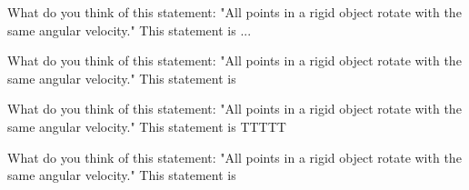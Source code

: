 \documentclass{ximera}
\begin{document}




\begin{exercise}
	\begin{question}
		What do you think of this statement: "All points in a rigid object rotate with the same angular velocity." This statement is ...\begin{multipleChoice} \end{multipleChoice}			
	\end{question}
\end{exercise}

\begin{exercise}
    \begin{question}
        What do you think of this statement: "All points in a rigid object rotate with the same angular velocity." This statement is 
    \end{question}
\end{exercise}

\newcommand{\choiceGroot}{{\wordChoice{\choice[correct]{Large}\choice{Small}}}}

\begin{exercise}
    \begin{question}
        What do you think of this statement: "All points in a rigid object rotate with the same angular velocity." This statement is  TTTTT
        \choiceTrue
    \end{question}
\end{exercise}


\begin{exercise}
    \begin{question}
        What do you think of this statement: "All points in a rigid object rotate with the same angular velocity." This statement is 
    \end{question}
\end{exercise}
\end{document}
